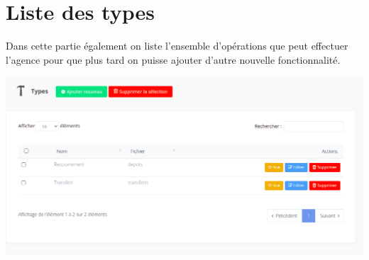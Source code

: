 	\section{Liste des types}
		Dans cette partie également on liste l'ensemble d'opérations que peut effectuer l'agence pour que plus tard on puisse ajouter d'autre nouvelle fonctionnalité.
		\begin{center}
			\includegraphics[scale=0.4]{chap_3/types.png}
			\label{mode_de_paiment}
		\end{center}
